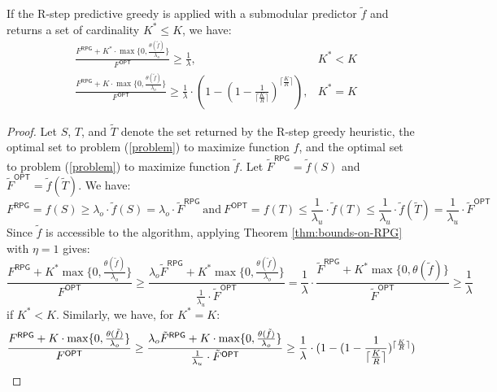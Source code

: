 \begin{theorem} 
If the R-step predictive greedy is applied with a submodular predictor $\tilde{f}$ and returns a set of cardinality $K^* \leq K$, we have:
\begin{align*}
& \frac{F^{\textsf{RPG}} + K^* \cdot \max \{ 0, \frac{\theta(\tilde{f})}{\lambda_o} \}}{F^{\textsf{OPT}}} \geq \frac{1}{\lambda},           & K^* < K\\
& \frac{F^{\textsf{RPG}} + K \cdot \max \{ 0, \frac{\theta(\tilde{f})}{\lambda_o} \}}{F^{\textsf{OPT}}} \geq \frac{1}{\lambda} \cdot ( 1 - (1 - \frac{1}{{\lceil \frac{K}{R} \rceil}})^{\lceil \frac{K}{R} \rceil}),  & K^* = K
\end{align*}
\end{theorem}
\begin{proof}
Let $S$, $T$, and $\tilde{T}$ denote the set returned by the R-step greedy heuristic, the optimal set to problem (\ref{problem}) to maximize function $f$, and the optimal set to problem (\ref{problem}) to maximize function $\tilde{f}$. Let ${{\tilde{F}}^{\textsf{RPG}}} = \tilde{f}(S)$ and ${\tilde{F}^{\textsf{OPT}}} = \tilde{f}(\tilde{T})$. We have:
\[ F^{\textsf{RPG}} = f(S) \geq \lambda_o \cdot \tilde{f}(S) = \lambda_o \cdot {\tilde{F}}^{\textsf{RPG}} ~\text{and}~ F^{\textsf{OPT}} = f(T) \leq \frac{1}{\lambda_u} \cdot \tilde{f}(T) \leq \frac{1}{\lambda_u} \cdot \tilde{f}(\tilde{T}) = \frac{1}{\lambda_u} \cdot {\tilde{F}^{\textsf{OPT}}} \]
Since $\tilde{f}$ is accessible to the algorithm, applying Theorem \ref{thm:bounds-on-RPG} with $\eta = 1$ gives: 
\[ \frac{F^{\textsf{RPG}} + K^* \max \{ 0, \frac{\theta(\tilde{f})}{\lambda_o} \}}{F^{\textsf{OPT}}} \geq \frac{\lambda_o {\tilde{F}}^{\textsf{RPG}} + K^* \max \{ 0, \frac{\theta(\tilde{f})}{\lambda_o} \}}{\frac{1}{\lambda_u} \cdot {\tilde{F}^{\textsf{OPT}}}} = \frac{1}{\lambda} \cdot \frac{{\tilde{F}}^{\textsf{RPG}} + K^* \max \{ 0, {\theta(\tilde{f})} \}}{{\tilde{F}^{\textsf{OPT}}}} \geq \frac{1}{\lambda} \]
if $K^* < K$. Similarly, we have, for $K^* = K$:
\[ \frac{F^{\textsf{RPG}} + K \cdot \max \{ 0, \frac{\theta(\tilde{f})}{\lambda_o} \}}{F^{\textsf{OPT}}} \geq \frac{\lambda_o {\tilde{F}}^{\textsf{RPG}} + K \cdot \max \{ 0, \frac{\theta(\tilde{f})}{\lambda_o} \}}{\frac{1}{\lambda_u} \cdot {\tilde{F}^{\textsf{OPT}}}} \geq \frac{1}{\lambda} \cdot ( 1 - (1 - \frac{1}{{\lceil \frac{K}{R} \rceil}})^{\lceil \frac{K}{R} \rceil}) \qedhere \]
\end{proof}

\newpage
